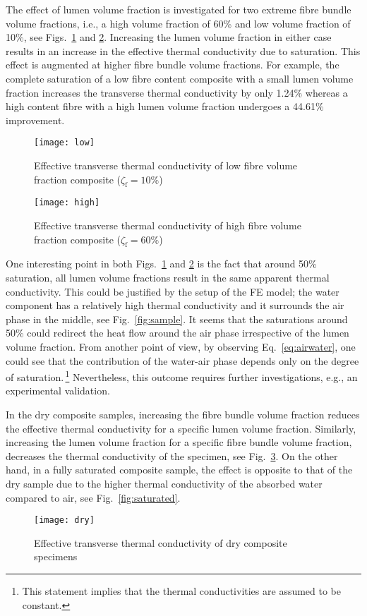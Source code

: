 	The effect of lumen volume fraction is investigated for two extreme fibre bundle volume fractions, i.e., a high volume fraction of 60\% and low volume fraction of 10\%, see Figs.~\ref{fig:low} and \ref{fig:high}. Increasing the lumen volume fraction in either case results in an increase in the effective thermal conductivity due to saturation. This effect is augmented at higher fibre bundle volume fractions. For example, the complete saturation of a low fibre content composite with a small lumen volume fraction increases the transverse thermal conductivity by only 1.24\% whereas a high content fibre with a high lumen volume fraction undergoes a 44.61\% improvement.

	
\begin{figure}[!h]{}
  \centering
 \texttt{[image: low]}
  \caption{Effective transverse thermal conductivity of low fibre volume fraction composite ($\zeta_{\text{f}}=10\%$)}
  \label{fig:low}
\end{figure}

\begin{figure}[!h]{}
  \centering
 \texttt{[image: high]}
  \caption{Effective transverse thermal conductivity of high fibre volume fraction composite ($\zeta_{\text{f}}=60\%$)}
  \label{fig:high}
\end{figure}

\red
	One interesting point in both Figs.~\ref{fig:low} and \ref{fig:high} is the fact that around 50\% saturation, all lumen volume fractions result in the same apparent thermal conductivity. This could be justified by the setup of the FE model; the water component has a relatively high thermal conductivity and it surrounds the air phase in the middle, see Fig.~\ref{fig:sample}. It seems that the saturations around 50\% could redirect the heat flow around the air phase irrespective of the lumen volume fraction. From another point of view, by observing Eq.~\eqref{eq:airwater}, one could see that the contribution of the water-air phase depends only on the degree of saturation.\,\footnote{This statement implies that the thermal conductivities are assumed to be constant.} Nevertheless, this outcome requires further investigations, e.g., an experimental validation.
\bl

	In the dry composite samples, increasing the fibre bundle volume fraction reduces the effective thermal conductivity for a specific lumen volume fraction. Similarly, increasing the lumen volume fraction for a specific fibre bundle volume fraction, decreases the thermal conductivity of the specimen, see Fig.~\ref{fig:dry}. On the other hand, in a fully saturated composite sample, the effect is opposite to that of the dry sample due to the higher thermal conductivity of the absorbed water compared to air, see Fig.~\ref{fig:saturated}.
\begin{figure}[!h]{}
  \centering
 \texttt{[image: dry]}
  \caption{Effective transverse thermal conductivity of dry composite specimens}
  \label{fig:dry}
\end{figure}

